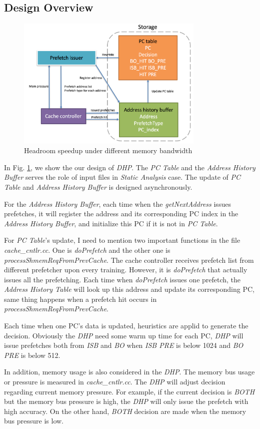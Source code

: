   \subsection{Design Overview}
  \label{sec:dynamicdesignoverview}
  \begin{figure}[ht!]
	   \centering
	   \includegraphics[width=0.8\textwidth]{images/dynamic_design.png}
	   \caption{Headroom speedup under different memory bandwidth}
	   \label{fig:dynamic_design}
  \end{figure}

  In Fig. \ref{fig:dynamic_design}, we show the our design of \emph{DHP}. The \emph{PC Table} and the \emph{Address History Buffer} serves the role of input files in \emph{Static Analysis} case. The update of \emph{PC Table} and \emph{Address History Buffer} is designed asynchronously.

  For the \emph{Address History Buffer}, each time when the \emph{getNextAddress} issues prefetches, it will register the address and its corresponding PC index in the \emph{Address History Buffer}, and initialize this PC if it is not in \emph{PC Table}.

  For \emph{PC Table}'s update, I need to mention two important functions in the file \emph{cache\_cntlr.cc}. One is \emph{doPrefetch} and the other one is \emph{processShmemReqFromPrevCache}. The cache controller receives prefetch list from different prefetcher upon every training. However, it is  \emph{doPrefetch} that actually issues all the prefetching. Each time when \emph{doPrefetch} issues one prefetch, the \emph{Address History Table} will look up this address and update its corresponding PC, same thing happens when a prefetch hit occurs in \emph{processShmemReqFromPrevCache}.

  Each time when one PC's data is updated, heuristics are applid to generate the decision. Obviously the \emph{DHP} need some warm up time for each PC, \emph{DHP} will issue prefetches both from \emph{ISB} and \emph{BO} when \emph{ISB PRE} is below 1024 and \emph{BO PRE} is below 512.

  In addition, memory usage is also considered in the \emph{DHP}. The memory bus usage or pressure is measured in \emph{cache\_cntlr.cc}. The \emph{DHP} will adjust decision regarding current memory pressure. For example, if the current decision is \emph{BOTH} but the memory bus pressure is high, the \emph{DHP} will only issue the prefetch with high accuracy. On the other hand, \emph{BOTH} decision are made when the memory bus pressure is low.
